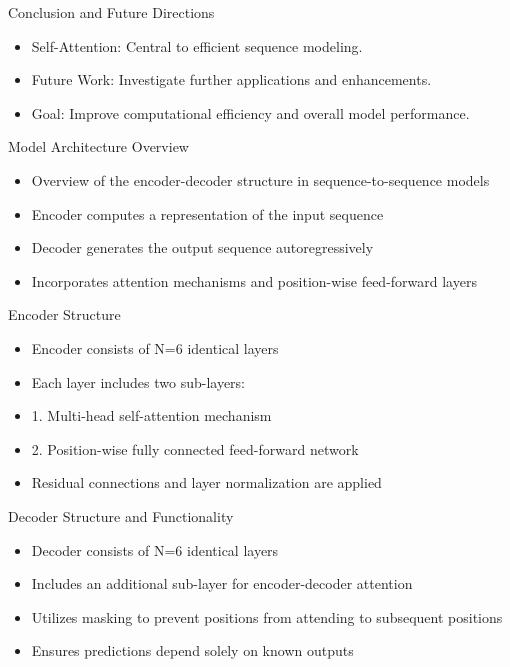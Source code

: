 \documentclass{beamer}
\begin{document}
\begin{frame}{Conclusion and Future Directions}
\begin{itemize}
\item Self-Attention: Central to efficient sequence modeling.
\item Future Work: Investigate further applications and enhancements.
\item Goal: Improve computational efficiency and overall model performance.
\end{itemize}
\end{frame}

\begin{frame}{Model Architecture Overview}
\begin{itemize}
\item Overview of the encoder-decoder structure in sequence-to-sequence models
\item Encoder computes a representation of the input sequence
\item Decoder generates the output sequence autoregressively
\item Incorporates attention mechanisms and position-wise feed-forward layers
\end{itemize}
\end{frame}

\begin{frame}{Encoder Structure}
\begin{itemize}
\item Encoder consists of N=6 identical layers
\item Each layer includes two sub-layers:
\item 1. Multi-head self-attention mechanism
\item 2. Position-wise fully connected feed-forward network
\item Residual connections and layer normalization are applied
\end{itemize}
\end{frame}

\begin{frame}{Decoder Structure and Functionality}
\begin{itemize}
\item Decoder consists of N=6 identical layers
\item Includes an additional sub-layer for encoder-decoder attention
\item Utilizes masking to prevent positions from attending to subsequent positions
\item Ensures predictions depend solely on known outputs
\end{itemize}
\end{frame}
\end{document}
